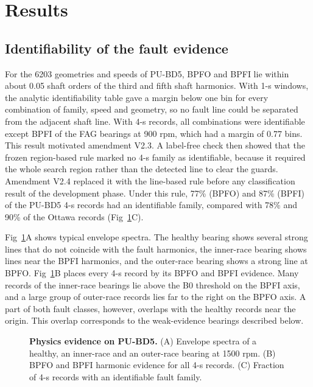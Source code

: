 \documentclass[10pt,letterpaper]{article}
\begin{document}
\section*{Results}

\subsection*{Identifiability of the fault evidence}
For the 6203 geometries and speeds of PU-BD5, BPFO and BPFI lie within about 0.05 shaft orders of the third and fifth shaft harmonics. With 1-s windows, the analytic identifiability table gave a margin below one bin for every combination of family, speed and geometry, so no fault line could be separated from the adjacent shaft line. With 4-s records, all combinations were identifiable except BPFI of the FAG bearings at 900 rpm, which had a margin of 0.77 bins. This result motivated amendment V2.3. A label-free check then showed that the frozen region-based rule marked no 4-s family as identifiable, because it required the whole search region rather than the detected line to clear the guards. Amendment V2.4 replaced it with the line-based rule before any classification result of the development phase. Under this rule, 77\% (BPFO) and 87\% (BPFI) of the PU-BD5 4-s records had an identifiable family, compared with 78\% and 90\% of the Ottawa records (Fig~\ref{fig3}C).

Fig~\ref{fig3}A shows typical envelope spectra. The healthy bearing shows several strong lines that do not coincide with the fault harmonics, the inner-race bearing shows lines near the BPFI harmonics, and the outer-race bearing shows a strong line at BPFO. Fig~\ref{fig3}B places every 4-s record by its BPFO and BPFI evidence. Many records of the inner-race bearings lie above the B0 threshold on the BPFI axis, and a large group of outer-race records lies far to the right on the BPFO axis. A part of both fault classes, however, overlaps with the healthy records near the origin. This overlap corresponds to the weak-evidence bearings described below.

\begin{figure}[!h]
\caption{\textbf{Physics evidence on PU-BD5.} (A) Envelope spectra of a healthy, an inner-race and an outer-race bearing at 1500 rpm. (B) BPFO and BPFI harmonic evidence for all 4-s records. (C) Fraction of 4-s records with an identifiable fault family.}
\label{fig3}
\end{figure}
\end{document}
